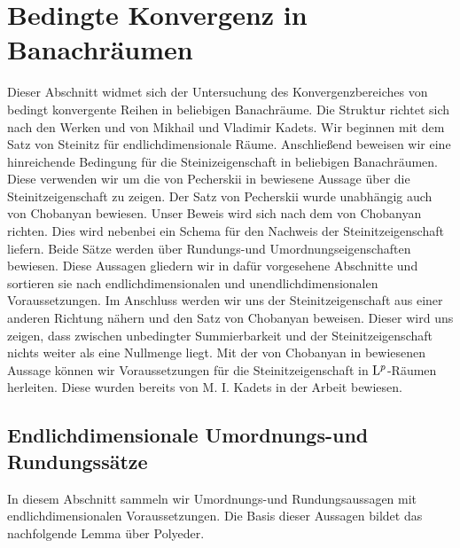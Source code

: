 \chapter{Bedingte Konvergenz in Banachräumen}
Dieser Abschnitt widmet sich der Untersuchung des Konvergenzbereiches von bedingt konvergente Reihen in beliebigen Banachräume.
Die  Struktur richtet sich nach den Werken \cite{Kadets1991} und \cite{Kadets1997} von Mikhail und Vladimir Kadets.
Wir beginnen mit dem Satz von Steinitz für endlichdimensionale Räume. 
Anschließend beweisen wir eine hinreichende Bedingung für die Steinizeigenschaft in beliebigen Banachräumen.
Diese verwenden wir um die von Pecherskii in \cite{Pecherski1989} bewiesene Aussage über die Steinitzeigenschaft zu zeigen. 
Der Satz von Pecherskii wurde unabhängig auch von Chobanyan\cite{Chobanyan1989} bewiesen. 
Unser Beweis wird sich nach dem von Chobanyan richten. Dies wird nebenbei ein Schema für den Nachweis der Steinitzeigenschaft liefern.
Beide Sätze werden über Rundungs-und Umordnungseigenschaften bewiesen. 
Diese Aussagen gliedern wir in dafür vorgesehene Abschnitte und sortieren sie nach endlichdimensionalen und unendlichdimensionalen Voraussetzungen.
Im Anschluss werden wir uns der Steinitzeigenschaft aus einer anderen Richtung nähern und den Satz von Chobanyan beweisen.
Dieser wird uns zeigen, dass zwischen unbedingter Summierbarkeit und der Steinitzeigenschaft nichts weiter als eine Nullmenge liegt.
Mit der von Chobanyan in \cite{Chobanyan1989} bewiesenen Aussage können wir Voraussetzungen für die Steinitzeigenschaft in $ \mathrm{L}^p $-Räumen herleiten.
Diese wurden bereits von M. I. Kadets in der Arbeit \cite{Kadets1954} bewiesen. 


\newpage
\section{Endlichdimensionale Umordnungs-und Rundungssätze}
In diesem Abschnitt sammeln wir Umordnungs-und Rundungsaussagen mit endlichdimensionalen Voraussetzungen.
Die Basis dieser Aussagen bildet das nachfolgende Lemma über Polyeder.


